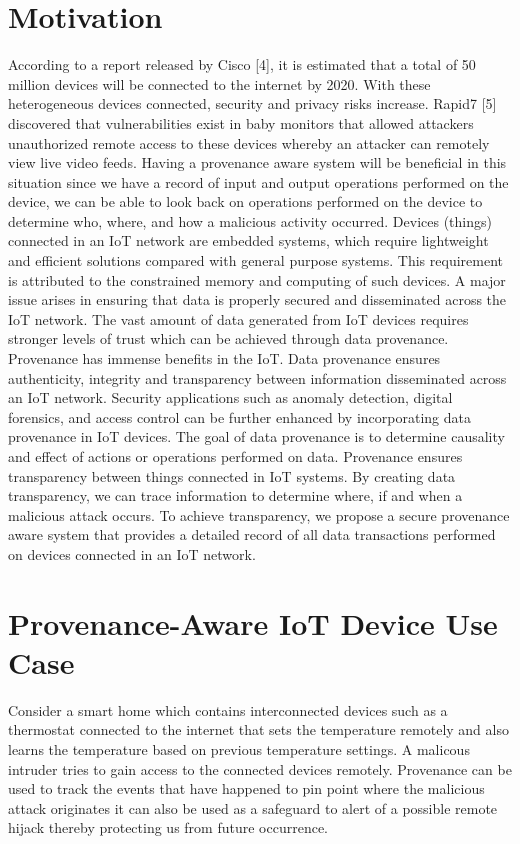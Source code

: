 \section{Motivation}
According to a report released by Cisco [4], it is estimated that a total of 50 million devices will be
connected to the internet by 2020. With these heterogeneous devices connected,
security and privacy risks increase. Rapid7 [5] discovered that vulnerabilities exist in
baby monitors that allowed attackers unauthorized remote access to these devices
whereby an attacker can remotely view live video feeds. Having a provenance aware
system will be beneficial in this situation since we have a record of input and output
operations performed on the device, we can be able to look back on operations
performed on the device to determine who, where, and how a malicious activity
occurred. Devices (things) connected in an IoT network are embedded systems, which
require lightweight and efficient solutions compared with general purpose
systems.
This requirement is attributed to the constrained memory and computing of such
devices. A major issue arises in ensuring that data is properly secured and
disseminated across the IoT network. The vast amount of data generated from IoT
devices requires stronger levels of trust which can be achieved through data
provenance. Provenance has immense benefits in the IoT. Data provenance ensures
authenticity, integrity and transparency between information disseminated across an
IoT network. Security applications such as anomaly detection, digital forensics, and
access control can be further enhanced by incorporating data provenance in IoT
devices. The goal of data provenance is to determine causality and effect of actions or
operations performed on data. Provenance ensures transparency between things
connected in IoT systems. By creating data transparency, we can trace information to
determine where, if and when a malicious attack occurs. To achieve transparency, we
propose a secure provenance aware system that provides a detailed record of all data
transactions performed on devices connected in an IoT network.

\section{Provenance-Aware IoT Device Use Case}

Consider a smart home which contains interconnected devices such as a thermostat connected to the internet that sets the temperature remotely and also learns the temperature based on previous temperature settings. A malicous intruder tries to gain access to the connected devices remotely. Provenance can be used to track the events that have happened to pin point where the malicious attack originates it can also be used as a safeguard to alert of a possible remote hijack thereby protecting us from future occurrence.




